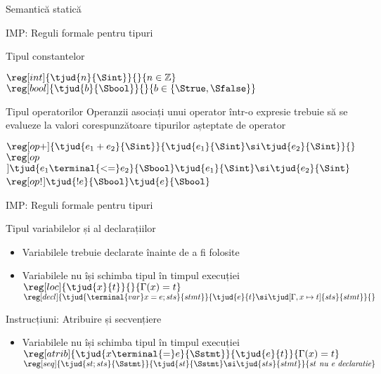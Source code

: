 \documentclass[xcolor=pdftex,romanian,colorlinks]{beamer}
\begin{document}
\begin{section}{Semantică statică}
    \begin{frame}{IMP: Reguli formale pentru tipuri}
    \begin{block}{Tipul constantelor}
    \begin{itemize}
    \vitem[] $\reg[int]{\tjud{n}{\Sint}}{}{n \in \mathbb{Z}}$
    \vitem[] $\reg[bool]{\tjud{b}{\Sbool}}{}{b\in \{\Strue,\Sfalse\}}$
    \end{itemize}
    \end{block}
    \begin{block}{Tipul operatorilor}
        Operanzii asociați unui operator într-o expresie trebuie să
          se evalueze la valori corespunzătoare tipurilor așteptate de operator
    \begin{itemize}
    \vitem[] $\reg[op+]{\tjud{e_1 + e_2}{\Sint}}{\tjud{e_1}{\Sint} \si \tjud{e_2}{\Sint}}{}$
    \vitem[] $\reg[op$\leq$]{\tjud{e_1 \terminal{<=} e_2}{\Sbool}}{\tjud{e_1}{\Sint} \si \tjud{e_2}{\Sint}}{}$
    \vitem[] $\reg[op$!$]{\tjud{!e}{\Sbool}}{\tjud{e}{\Sbool}}{}$
    \end{itemize}
    \end{block}
  \end{frame}
  \begin{frame}{IMP: Reguli formale pentru tipuri}
    \begin{block}{Tipul variabilelor și al declarațiilor}
        \begin{itemize}
        \item Variabilele trebuie declarate înainte de a fi folosite
        \item Variabilele nu își schimba tipul în timpul execuției
      \vitem[] $\reg[loc]{\tjud{x}{t}}{}{\Gamma(x) = t}$
        \vitem[] $\reg[decl]{\tjud{\terminal{var} x = e ; sts}{stmt}}{\tjud{e}{t} \si \tjud[\Gamma, x \mapsto t]{sts}{stmt}}{}$
        \end{itemize}
    \end{block}
    \begin{block}{Instrucțiuni: Atribuire și secvențiere}
      \begin{itemize}
        \item Variabilele nu își schimba tipul în timpul execuției
    \vitem[] $\reg[atrib]{\tjud{x\terminal{=}e}{\Sstmt}}{\tjud{e}{t}}{\Gamma(x) = t}$
        \vitem[] $\reg[seq]{\tjud{st ; sts}{\Sstmt}}{\tjud{st}{\Sstmt} \si \tjud{sts}{stmt}}{st \textit{ nu e declaratie}}$
      \end{itemize}
    \end{block}
  \end{frame}

\end{section}
\end{document}

